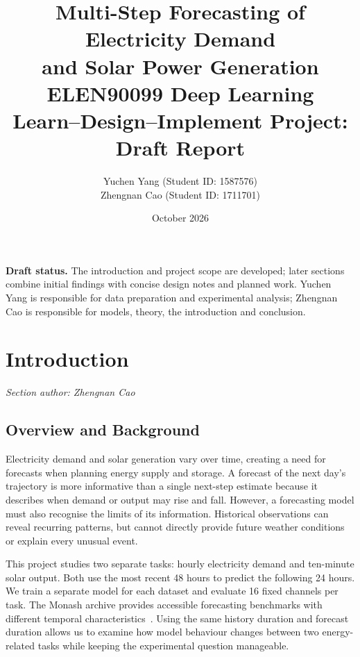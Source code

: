 \documentclass[11pt,a4paper]{article}
\title{\textbf{Multi-Step Forecasting of Electricity Demand\protect\\and Solar Power Generation}\protect\\[8pt]
\large ELEN90099 Deep Learning\protect\\Learn--Design--Implement Project: Draft Report}
\author{Yuchen Yang (Student ID: 1587576)\protect\\Zhengnan Cao (Student ID: 1711701)}
\date{October 2026}
\newcommand{\sectionauthor}[1]{\noindent\textit{Section author: #1}\par\vspace{3pt}}
\begin{document}
\hypersetup{pageanchor=false}
\begin{titlepage}
\maketitle\thispagestyle{empty}
\vfill
\begin{center}\begin{minipage}{0.85\textwidth}
\textbf{Draft status.} The introduction and project scope are developed; later sections combine initial findings with concise design notes and planned work. Yuchen Yang is responsible for data preparation and experimental analysis; Zhengnan Cao is responsible for models, theory, the introduction and conclusion.
\end{minipage}\end{center}
\end{titlepage}
\hypersetup{pageanchor=true}
\tableofcontents\clearpage{}

\section{Introduction}\label{sec:introduction}
\sectionauthor{Zhengnan Cao}
\subsection{Overview and Background}
Electricity demand and solar generation vary over time, creating a need for forecasts when planning energy supply and storage. A forecast of the next day's trajectory is more informative than a single next-step estimate because it describes when demand or output may rise and fall. However, a forecasting model must also recognise the limits of its information. Historical observations can reveal recurring patterns, but cannot directly provide future weather conditions or explain every unusual event.

This project studies two separate tasks: hourly electricity demand and ten-minute solar output. Both use the most recent 48 hours to predict the following 24 hours. We train a separate model for each dataset and evaluate 16 fixed channels per task. The Monash archive provides accessible forecasting benchmarks with different temporal characteristics~\cite{monash}. Using the same history duration and forecast duration allows us to examine how model behaviour changes between two energy-related tasks while keeping the experimental question manageable.
\end{document}
